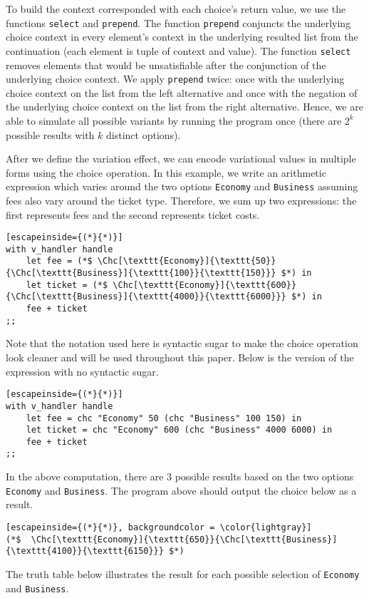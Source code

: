 To build the context corresponded with each choice's return value, we use the functions \texttt{select} and \texttt{prepend}. The function \texttt{prepend} conjuncts the underlying choice context in every element's context in the underlying resulted list from the continuation (each element is tuple of context and value). The function \texttt{select} removes elements that would be unsatisfiable after the conjunction of the underlying choice context. We apply \texttt{prepend} twice: once with the underlying choice context on the list from the left alternative and once with the negation of the underlying choice context on the list from the right alternative. Hence, we are able to simulate all possible variants by running the program once (there are $2^k$ possible results with $k$ distinct options). 

After we define the variation effect, we can encode variational values in multiple forms using the choice operation. In this example, we write an arithmetic expression which varies around the two options \texttt{Economy} and \texttt{Business} assuming fees also vary around the ticket type. Therefore, we sum up two expressions: the first represents fees and the second represents ticket costs. 

%
\begin{lstlisting}[escapeinside={(*}{*)}]
with v_handler handle
    let fee = (*$ \Chc[\texttt{Economy}]{\texttt{50}}{\Chc[\texttt{Business}]{\texttt{100}}{\texttt{150}}} $*) in 
    let ticket = (*$ \Chc[\texttt{Economy}]{\texttt{600}}{\Chc[\texttt{Business}]{\texttt{4000}}{\texttt{6000}}} $*) in
    fee + ticket
;;
\end{lstlisting}
%
Note that the notation used here is syntactic sugar to make the choice operation look cleaner and will be used throughout this paper. Below is the version of the expression with no syntactic sugar.
%
\begin{lstlisting}[escapeinside={(*}{*)}]
with v_handler handle
    let fee = chc "Economy" 50 (chc "Business" 100 150) in 
    let ticket = chc "Economy" 600 (chc "Business" 4000 6000) in
    fee + ticket
;;
\end{lstlisting}
%
In the above computation, there are 3 possible results based on the two options \texttt{Economy} and \texttt{Business}. The program above should output the choice below as a result.
%
\begin{lstlisting}[escapeinside={(*}{*)}, backgroundcolor = \color{lightgray}]
(*$  \Chc[\texttt{Economy}]{\texttt{650}}{\Chc[\texttt{Business}]{\texttt{4100}}{\texttt{6150}}} $*)
\end{lstlisting}
%
The truth table below illustrates the result for each possible selection of \texttt{Economy} and \texttt{Business}.

